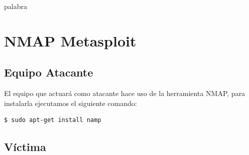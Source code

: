 \documentclass[a4,12pt,onecolum]{article}
\begin{document}

\thispagestyle{empty}
\textcolor[rgb]{1.00,1.00,1.00}{palabra} %
\newpage

\setcounter{page}{3}


\newpage
\tableofcontents 		%
\newpage



\clearpage

\section{NMAP Metasploit}
\subsection{Equipo Atacante}
El equipo que actuará como atacante hace uso de la herramienta NMAP, para instalarla ejecutamos el siguiente comando:
\begin{verbatim}
$ sudo apt-get install namp
\end{verbatim}
\subsection{Víctima}
\end{document}
